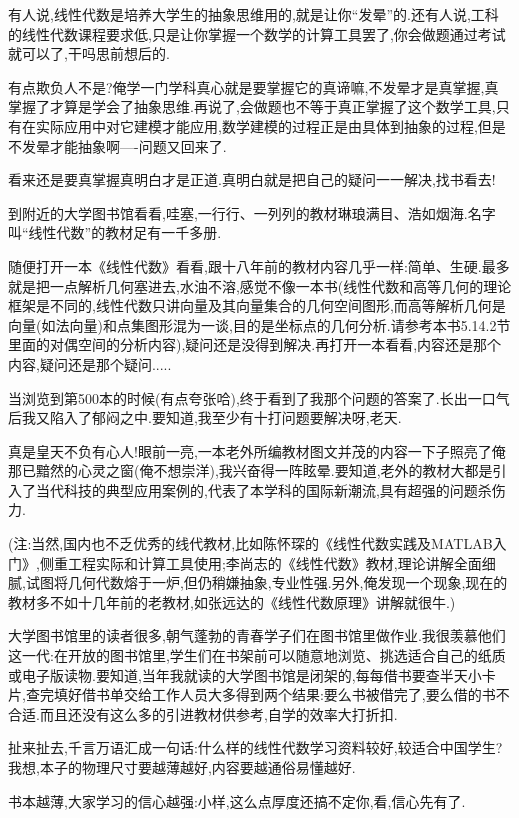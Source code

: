 \documentclass[12pt]{article}
\renewcommand{\,}{\ \text{,}}
\renewcommand{\.}{\ \text{.}}
\begin{document}
有人说,线性代数是培养大学生的抽象思维用的,就是让你``发晕''的.还有人说,工科的线性代数课程要求低,只是让你掌握一个数学的计算工具罢了,你会做题通过考试就可以了,干吗思前想后的.

有点欺负人不是?俺学一门学科真心就是要掌握它的真谛嘛,不发晕才是真掌握,真掌握了才算是学会了抽象思维.再说了,会做题也不等于真正掌握了这个数学工具,只有在实际应用中对它建模才能应用,数学建模的过程正是由具体到抽象的过程,但是不发晕才能抽象啊----问题又回来了.

看来还是要真掌握真明白才是正道.真明白就是把自己的疑问一一解决,找书看去!

到附近的大学图书馆看看,哇塞,一行行、一列列的教材琳琅满目、浩如烟海.名字叫``线性代数''的教材足有一千多册.

随便打开一本《线性代数》看看,跟十八年前的教材内容几乎一样:简单、生硬.最多就是把一点解析几何塞进去,水油不溶,感觉不像一本书(线性代数和高等几何的理论框架是不同的,线性代数只讲向量及其向量集合的几何空间图形,而高等解析几何是向量(如法向量)和点集图形混为一谈,目的是坐标点的几何分析.请参考本书5.14.2节里面的对偶空间的分析内容),疑问还是没得到解决.再打开一本看看,内容还是那个内容,疑问还是那个疑问.....

当浏览到第500本的时候(有点夸张哈),终于看到了我那个问题的答案了.长出一口气后我又陷入了郁闷之中.要知道,我至少有十打问题要解决呀,老天.

真是皇天不负有心人!眼前一亮,一本老外所编教材图文并茂的内容一下子照亮了俺那已黯然的心灵之窗(俺不想崇洋),我兴奋得一阵眩晕.要知道,老外的教材大都是引入了当代科技的典型应用案例的,代表了本学科的国际新潮流,具有超强的问题杀伤力.

(注:当然,国内也不乏优秀的线代教材,比如陈怀琛的《线性代数实践及MATLAB入门》,侧重工程实际和计算工具使用;李尚志的《线性代数》教材,理论讲解全面细腻,试图将几何代数熔于一炉,但仍稍嫌抽象,专业性强.另外,俺发现一个现象,现在的教材多不如十几年前的老教材,如张远达的《线性代数原理》讲解就很牛.)

大学图书馆里的读者很多,朝气蓬勃的青春学子们在图书馆里做作业.我很羡慕他们这一代:在开放的图书馆里,学生们在书架前可以随意地浏览、挑选适合自己的纸质或电子版读物.要知道,当年我就读的大学图书馆是闭架的,每每借书要查半天小卡片,查完填好借书单交给工作人员大多得到两个结果:要么书被借完了,要么借的书不合适.而且还没有这么多的引进教材供参考,自学的效率大打折扣.

扯来扯去,千言万语汇成一句话:什么样的线性代数学习资料较好,较适合中国学生?\\
我想,本子的物理尺寸要越薄越好,内容要越通俗易懂越好.

书本越薄,大家学习的信心越强:小样,这么点厚度还搞不定你,看,信心先有了.
\end{document}
